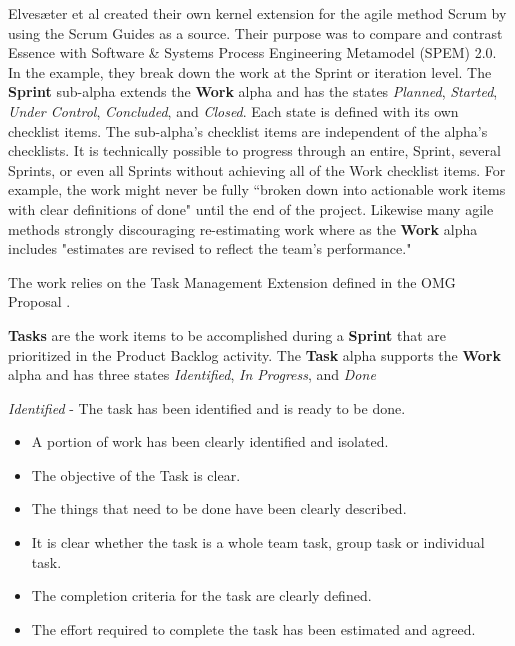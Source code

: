 \documentclass[preprint,12pt,3p]{elsarticle}
\begin{document}
{Elves{\ae}ter et al \cite{Elvesaeter2013} created their own kernel extension for the agile method Scrum \cite{Schwaber2001} by using the Scrum Guides \cite{ScrumGuide} as a source. Their purpose was to compare and contrast Essence with Software \& Systems Process Engineering Metamodel (SPEM) 2.0. In the example, they break down the work at the Sprint or iteration level. The \textbf{Sprint} sub-alpha extends the \textbf{Work} alpha and has the states \textit{Planned}, \textit{Started}, \textit{Under Control}, \textit{Concluded}, and \textit{Closed}. Each state is defined with its own checklist items. The sub-alpha's checklist items are independent of the alpha's checklists. It is technically possible to progress through an entire, Sprint, several Sprints, or even all Sprints without achieving all of the Work checklist items. For example, the work might never be fully ``broken down into actionable work items with clear definitions of done" until the end of the project. Likewise many agile methods strongly discouraging re-estimating work \cite{} where as the \textbf{Work} alpha includes "estimates are revised to reflect the team’s performance."  


The work relies on the Task Management Extension defined in the OMG Proposal \cite{OMG}. 

\textbf{Tasks} are the work items to be accomplished during a \textbf{Sprint} that are prioritized in the Product Backlog activity. The \textbf{Task} alpha supports the \textbf{Work} alpha and has three states \textit{Identified}, \textit{In Progress}, and \textit{Done}

\textit{Identified} - The task has been identified and is ready to be done.
\begin{itemize}
\item A portion of work has been clearly identified and isolated.
\item The objective of the Task is clear.
\item The things that need to be done have been clearly described.
\item It is clear whether the task is a whole team task, group task or individual task.
\item The completion criteria for the task are clearly defined.
\item The effort required to complete the task has been estimated and agreed.
\end{itemize}

}
\end{document}
